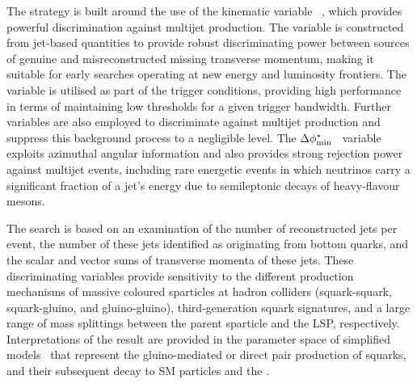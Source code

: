 The strategy is built around the use of the kinematic variable
\alphat~\cite{Randall:2008rw, RA1Paper}, which provides powerful
discrimination against multijet production. The \alphat variable is
constructed from jet-based quantities to provide robust discriminating
power between sources of genuine and misreconstructed missing
transverse momentum, making it suitable for early searches operating
at new energy and luminosity frontiers. The \alphat variable is
utilised as part of the trigger conditions, providing high performance
in terms of maintaining low thresholds for a given trigger
bandwidth. Further variables are also employed to discriminate against
multijet production and suppress this background process to a
negligible level. The $\Delta\phi^{*}_{\rm min}$~\cite{RA1Paper}
variable exploits azimuthal angular information and also provides
strong rejection power against multijet events, including rare
energetic events in which neutrinos carry a significant fraction of a
jet's energy due to semileptonic decays of heavy-flavour mesons.


The search is based on an examination of the number of reconstructed
jets per event, the number of these jets identified as originating
from bottom quarks, and the scalar and vector sums of transverse
momenta of these jets. 
These discriminating variables provide sensitivity to the different
production mechanisms of massive coloured sparticles at hadron
colliders (\ie squark-squark, squark-gluino, and gluino-gluino),
third-generation squark signatures, and a large range of mass
splittings between the parent sparticle and the LSP,
respectively. Interpretations of the result are provided in the
parameter space of simplified models~\cite{Alwall:2008ag,
  Alwall:2008va, sms} that represent the gluino-mediated or direct
pair production of squarks, and their subsequent decay to SM particles
and the \chiz.

